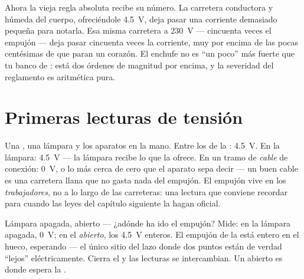 \begin{remark}\label{rem:g8:voltage-voltmeter:mains}
Ahora la vieja regla absoluta recibe su número. La carretera conductora
y húmeda del cuerpo, ofreciéndole \qty{4.5}{V}, deja pasar una
corriente demasiado pequeña para notarla. Esa misma carretera a
\qty{230}{V} --- cincuenta veces el empujón --- deja pasar cincuenta
veces la corriente, muy por encima de las pocas centésimas de
 que paran un corazón. El enchufe no es ``un poco'' más
fuerte que tu banco de : está dos órdenes de magnitud por encima,
y la severidad del reglamento es aritmética pura.
\end{remark}

\section{Primeras lecturas de tensión}

\begin{example}\label{ex:g8:voltage-voltmeter:readings}
Una , una lámpara y los aparatos en la mano. Entre los
 de la : \qty{4.5}{V}. En la lámpara: \qty{4.5}{V} ---
la lámpara recibe lo que la  ofrece. En un tramo de
\emph{cable} de conexión: \qty{0}{V}, o lo más cerca de cero que el
aparato sepa decir --- un buen cable es una carretera llana que no
gasta nada del empujón. El empujón vive en los \emph{trabajadores}, no
a lo largo de las carreteras: una lectura que conviene recordar para
cuando las leyes del capítulo siguiente la hagan oficial.
\end{example}

\begin{example}\label{ex:g8:voltage-voltmeter:openswitch}
Lámpara apagada,  abierto --- ¿adónde ha ido el
empujón? Mide: en la lámpara apagada, \qty{0}{V}; en el
\emph{ abierto}, los \qty{4.5}{V} enteros. El empujón de
la  está entero en el hueco, esperando --- el único sitio del
lazo donde dos puntos están de verdad ``lejos'' eléctricamente. Cierra
el  y las lecturas se intercambian. Un
 abierto es donde espera la .
\end{example}

